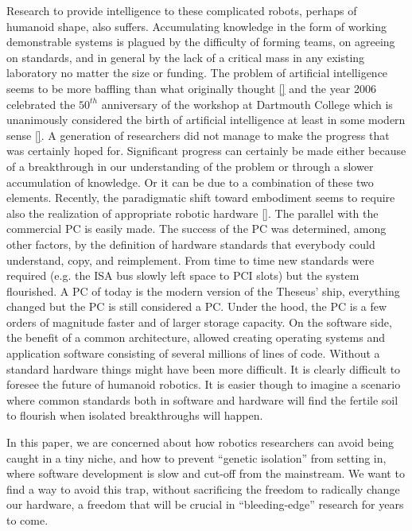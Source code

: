 %
Research to provide intelligence to these complicated robots, perhaps
of humanoid shape, also suffers. Accumulating knowledge 
in the form of working demonstrable systems is plagued by the   
difficulty of forming teams, on agreeing on standards, and in 
general by the lack of a critical mass in any existing laboratory no 
matter the size or funding. The problem of artificial intelligence seems
to be more baffling than what originally thought \ref{} and the year 2006 
celebrated the $50^{th}$ anniversary of the workshop at Dartmouth College
which is unanimously considered the birth of artificial intelligence at 
least in some modern sense \ref{}. %
A generation of researchers did not manage to make the progress that was
certainly hoped for. Significant progress can certainly be made either 
because of a breakthrough in our understanding of the problem or through 
a slower accumulation of knowledge. Or it can be due to a combination of 
these two elements. Recently, the paradigmatic shift toward embodiment 
seems to require also the realization of appropriate robotic hardware \ref{}. 
The parallel with the commercial PC is easily made. The success of the PC was
determined, among other factors, by the definition of hardware standards
that everybody could understand, copy, and reimplement. From time
to time new standards were required (e.g. the ISA bus slowly left
space to PCI slots) but the system flourished. A PC of today is the modern 
version of the Theseus' ship, everything changed but the PC is still considered
a PC. Under the hood, the PC is a few orders of magnitude faster and of larger
storage capacity. On the software side, the benefit of a common architecture, 
allowed creating operating systems and application software consisting of 
several millions of lines of code. Without a standard hardware things
might have been more difficult.
It is clearly difficult to foresee the future of humanoid robotics. It is
easier though to imagine a scenario where common standards both in software and
hardware will find the fertile soil to flourish when isolated breakthroughs 
will happen.

%
In this paper, we are concerned
about how robotics researchers can avoid being caught in a tiny
niche, and how to prevent ``genetic isolation'' from setting in,
where software development is slow and cut-off from the mainstream.
We want to find a way to avoid this trap, without sacrificing
the freedom to radically change our hardware, a freedom that
will be crucial in ``bleeding-edge'' research for years to come.

